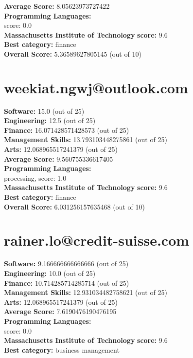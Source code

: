 \documentclass{article}
\begin{document}
\textbf{Average Score: } 8.05623973727422\\
\textbf{Programming Languages:} \\
score: 0.0\\
\textbf{Massachusetts Institute of Technology} \textbf{score:} 9.6\\
\textbf{Best category: } finance\\
\textbf{Overall Score: }5.36589627805145 (out of 10)\section{weekiat.ngwj@outlook.com}
\textbf{Software:} 15.0 (out of 25)\\
\textbf{Engineering: } 12.5 (out of 25)\\
\textbf{Finance:} 16.071428571428573 (out of 25)\\
\textbf{Management Skills:} 13.793103448275861 (out of 25)\\
\textbf{Arts:} 12.068965517241379 (out of 25)\\
\textbf{Average Score: } 9.560755336617405\\
\textbf{Programming Languages:} \\
processing, score: 1.0\\
\textbf{Massachusetts Institute of Technology} \textbf{score:} 9.6\\
\textbf{Best category: } finance\\
\textbf{Overall Score: }6.031256157635468 (out of 10)\section{rainer.lo@credit-suisse.com}
\textbf{Software:} 9.166666666666666 (out of 25)\\
\textbf{Engineering: } 10.0 (out of 25)\\
\textbf{Finance:} 10.714285714285714 (out of 25)\\
\textbf{Management Skills:} 12.931034482758621 (out of 25)\\
\textbf{Arts:} 12.068965517241379 (out of 25)\\
\textbf{Average Score: } 7.6190476190476195\\
\textbf{Programming Languages:} \\
score: 0.0\\
\textbf{Massachusetts Institute of Technology} \textbf{score:} 9.6\\
\textbf{Best category: } business management\\
\end{document}
